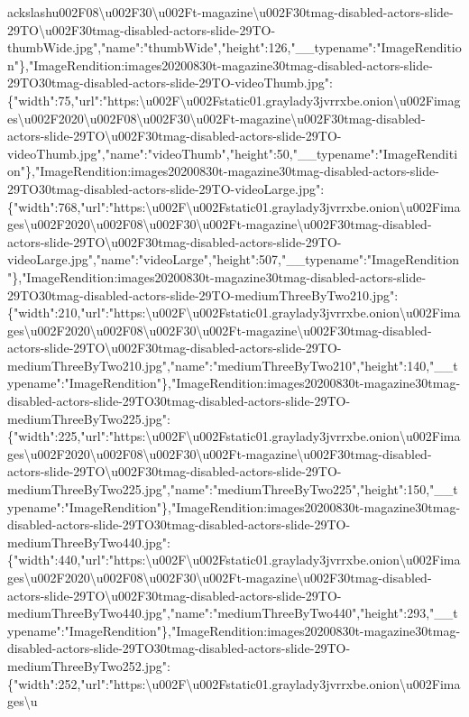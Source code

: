 ackslash{}u002F08\textbackslash{}u002F30\textbackslash{}u002Ft-magazine\textbackslash{}u002F30tmag-disabled-actors-slide-29TO\textbackslash{}u002F30tmag-disabled-actors-slide-29TO-thumbWide.jpg","name":"thumbWide","height":126,"\_\_typename":"ImageRendition"\},"ImageRendition:images20200830t-magazine30tmag-disabled-actors-slide-29TO30tmag-disabled-actors-slide-29TO-videoThumb.jpg":\{"width":75,"url":"https:\textbackslash{}u002F\textbackslash{}u002Fstatic01.graylady3jvrrxbe.onion\textbackslash{}u002Fimages\textbackslash{}u002F2020\textbackslash{}u002F08\textbackslash{}u002F30\textbackslash{}u002Ft-magazine\textbackslash{}u002F30tmag-disabled-actors-slide-29TO\textbackslash{}u002F30tmag-disabled-actors-slide-29TO-videoThumb.jpg","name":"videoThumb","height":50,"\_\_typename":"ImageRendition"\},"ImageRendition:images20200830t-magazine30tmag-disabled-actors-slide-29TO30tmag-disabled-actors-slide-29TO-videoLarge.jpg":\{"width":768,"url":"https:\textbackslash{}u002F\textbackslash{}u002Fstatic01.graylady3jvrrxbe.onion\textbackslash{}u002Fimages\textbackslash{}u002F2020\textbackslash{}u002F08\textbackslash{}u002F30\textbackslash{}u002Ft-magazine\textbackslash{}u002F30tmag-disabled-actors-slide-29TO\textbackslash{}u002F30tmag-disabled-actors-slide-29TO-videoLarge.jpg","name":"videoLarge","height":507,"\_\_typename":"ImageRendition"\},"ImageRendition:images20200830t-magazine30tmag-disabled-actors-slide-29TO30tmag-disabled-actors-slide-29TO-mediumThreeByTwo210.jpg":\{"width":210,"url":"https:\textbackslash{}u002F\textbackslash{}u002Fstatic01.graylady3jvrrxbe.onion\textbackslash{}u002Fimages\textbackslash{}u002F2020\textbackslash{}u002F08\textbackslash{}u002F30\textbackslash{}u002Ft-magazine\textbackslash{}u002F30tmag-disabled-actors-slide-29TO\textbackslash{}u002F30tmag-disabled-actors-slide-29TO-mediumThreeByTwo210.jpg","name":"mediumThreeByTwo210","height":140,"\_\_typename":"ImageRendition"\},"ImageRendition:images20200830t-magazine30tmag-disabled-actors-slide-29TO30tmag-disabled-actors-slide-29TO-mediumThreeByTwo225.jpg":\{"width":225,"url":"https:\textbackslash{}u002F\textbackslash{}u002Fstatic01.graylady3jvrrxbe.onion\textbackslash{}u002Fimages\textbackslash{}u002F2020\textbackslash{}u002F08\textbackslash{}u002F30\textbackslash{}u002Ft-magazine\textbackslash{}u002F30tmag-disabled-actors-slide-29TO\textbackslash{}u002F30tmag-disabled-actors-slide-29TO-mediumThreeByTwo225.jpg","name":"mediumThreeByTwo225","height":150,"\_\_typename":"ImageRendition"\},"ImageRendition:images20200830t-magazine30tmag-disabled-actors-slide-29TO30tmag-disabled-actors-slide-29TO-mediumThreeByTwo440.jpg":\{"width":440,"url":"https:\textbackslash{}u002F\textbackslash{}u002Fstatic01.graylady3jvrrxbe.onion\textbackslash{}u002Fimages\textbackslash{}u002F2020\textbackslash{}u002F08\textbackslash{}u002F30\textbackslash{}u002Ft-magazine\textbackslash{}u002F30tmag-disabled-actors-slide-29TO\textbackslash{}u002F30tmag-disabled-actors-slide-29TO-mediumThreeByTwo440.jpg","name":"mediumThreeByTwo440","height":293,"\_\_typename":"ImageRendition"\},"ImageRendition:images20200830t-magazine30tmag-disabled-actors-slide-29TO30tmag-disabled-actors-slide-29TO-mediumThreeByTwo252.jpg":\{"width":252,"url":"https:\textbackslash{}u002F\textbackslash{}u002Fstatic01.graylady3jvrrxbe.onion\textbackslash{}u002Fimages\textbackslash{}u